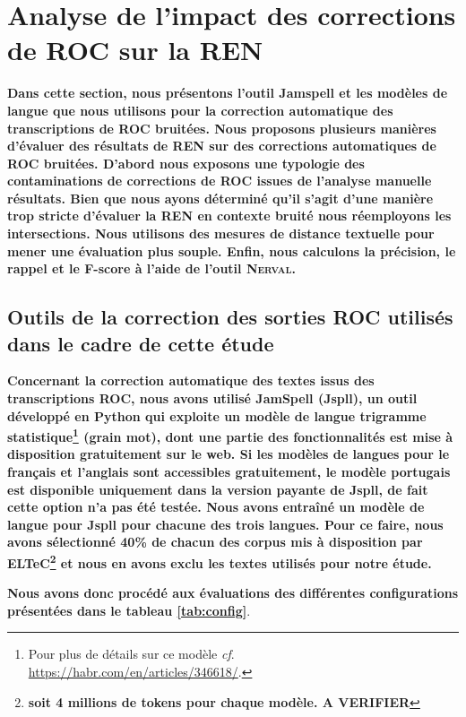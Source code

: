 
\section{Analyse de l'impact des corrections de ROC sur la REN}
\label{sec:COR-OCR-IMPACT-NER}

\textbf{Dans cette section, nous présentons l'outil Jamspell et les modèles de langue que nous utilisons pour la correction automatique des transcriptions de ROC bruitées. Nous proposons plusieurs manières d'évaluer des résultats de REN sur des  corrections automatiques de ROC bruitées. D'abord nous exposons une typologie des contaminations de corrections de ROC issues de l'analyse manuelle résultats. Bien que nous ayons déterminé qu'il s'agit d'une manière trop stricte d'évaluer la REN en contexte bruité nous réemployons les intersections. Nous utilisons  des mesures de distance textuelle pour mener une évaluation plus souple. Enfin, nous calculons la précision, le rappel et le F-score à l'aide de l'outil \textsc{Nerval}.}

\subsection{Outils de la correction des sorties ROC utilisés dans le cadre de cette étude}
\label{subsec:outils_COR-OCR-IMPACT-NER}
\textbf{Concernant la correction automatique des textes issus des transcriptions ROC, nous avons utilisé JamSpell (Jspll), un outil développé en Python qui exploite un modèle de langue trigramme statistique\footnote{Pour plus de détails sur ce modèle \textit{cf}. \url{https://habr.com/en/articles/346618/}.} (grain mot), dont une partie des fonctionnalités est mise à disposition gratuitement sur le web.
Si les modèles de langues pour le français et l'anglais sont accessibles gratuitement, le modèle portugais est disponible uniquement dans la version payante de Jspll, de fait cette option n'a pas été testée.
Nous avons entraîné un modèle de langue pour Jspll pour chacune des trois langues. Pour ce faire, nous avons sélectionné 40\% de chacun des corpus mis à disposition par ELTeC\footnote{\textbf{soit 4 millions de tokens pour chaque modèle. A VERIFIER}} et nous en avons exclu les textes utilisés pour notre étude.}

\textbf{Nous avons donc procédé aux évaluations des différentes configurations présentées dans le tableau \ref{tab:config}}.

